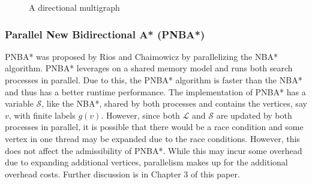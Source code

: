     \begin{figure}
        \caption{A directional multigraph}
        \label{uni-multigraph1}
        \begin{center}
        \end{center}
        
    \end{figure}

\subsubsection{Parallel New Bidirectional A* (PNBA*)}
PNBA* was proposed by Rios and Chaimowicz by parallelizing the NBA* algorithm.\cite{Rios2011}
PNBA* leverages on a shared memory model and runs both search processes in parallel. Due to this, the PNBA* algorithm is 
faster than the NBA* and thus has a better runtime performance. The implementation of PNBA* has a variable $\mathcal{S}$, like the 
NBA*, shared by both processes and contains the vertices, say $v$, with finite labels $g(v)$. However, since both $\mathcal{L}$
and $\mathcal{S}$ are updated by both processes in parallel, it is possible that there would be a race condition and some vertex 
in one thread may be expanded due to the race conditions. However, this does not affect the admissibility of PNBA*.
While this may incur some overhead due to expanding additional vertices, parallelism makes up for the additional overhead costs.\cite{Rios2011}
Further discussion is in Chapter 3 of this paper.

